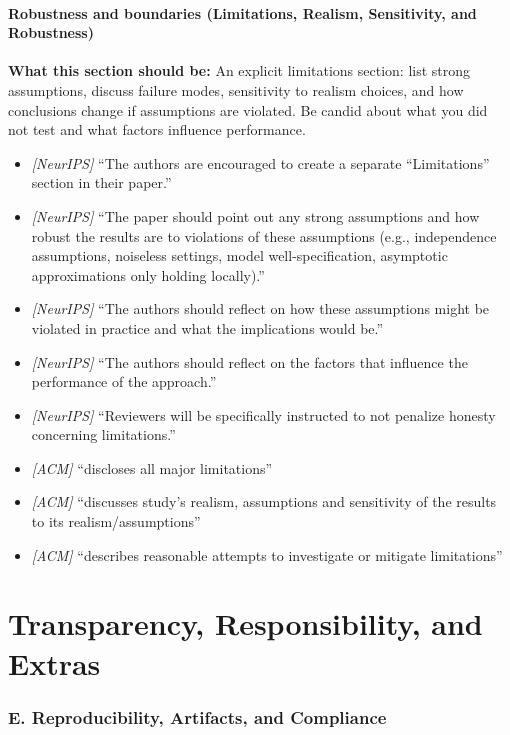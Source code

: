 \documentclass[11pt]{article}
\begin{document}
\subsection{Robustness and boundaries (Limitations, Realism, Sensitivity, and Robustness)}
\noindent\textbf{What this section should be:}
An explicit limitations section: list strong assumptions, discuss failure modes, sensitivity to realism choices, and how conclusions change if assumptions are violated. Be candid about what you did not test and what factors influence performance.
\begin{itemize}
  \item \textit{[NeurIPS]} ``The authors are encouraged to create a separate ``Limitations'' section in their paper.''
  \item \textit{[NeurIPS]} ``The paper should point out any strong assumptions and how robust the results are to violations of these assumptions (e.g., independence assumptions, noiseless settings, model well-specification, asymptotic approximations only holding locally).''
  \item \textit{[NeurIPS]} ``The authors should reflect on how these assumptions might be violated in practice and what the implications would be.''
  \item \textit{[NeurIPS]} ``The authors should reflect on the factors that influence the performance of the approach.''
  \item \textit{[NeurIPS]} ``Reviewers will be specifically instructed to not penalize honesty concerning limitations.''
  \item \textit{[ACM]} ``discloses all major limitations''
  \item \textit{[ACM]} ``discusses study’s realism, assumptions and sensitivity of the results to its realism/assumptions''
  \item \textit{[ACM]} ``describes reasonable attempts to investigate or mitigate limitations''
\end{itemize}

\part{Transparency, Responsibility, and Extras}

\section*{E. Reproducibility, Artifacts, and Compliance}
\end{document}

